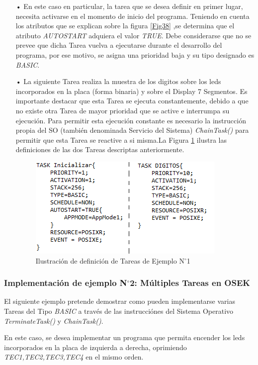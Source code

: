 \documentclass[12pt,letterpaper]{article}
\begin{document}
\begin{enumerate}
\item[•]En este caso en particular, la tarea que se desea definir en primer lugar, necesita activarse en el momento de inicio del programa. Teniendo en cuenta los atributos que se explican sobre la figura \ref{Fig38} ,se determina que el atributo \textit{AUTOSTART} adquiera el valor \textit{TRUE}. Debe considerarse que no se prevee que dicha Tarea vuelva a ejecutarse durante el desarrollo del programa, por ese motivo, se asigna una prioridad baja y su tipo designado es \textit{BASIC}.

\item[•]La siguiente Tarea realiza la muestra de los digitos sobre los leds incorporados en la placa (forma binaria) y sobre el Display 7 Segmentos. Es importante destacar que esta Tarea se ejecuta constantemente, debido a que no existe otra Tarea de mayor prioridad que se active e interrumpa su ejecución. Para permitir esta ejecución constante es necesario la instrucción propia del SO (también denominada Servicio del Sistema) \textit{ChainTask()} para permitir que esta Tarea se reactive a si misma.La Figura \ref{Fig39} ilustra las definiciones de las dos Tareas descriptas anteriormente.
\begin{figure}[H]
\centering
\includegraphics[width=8 cm]{figuras/f22.png}
\caption{Ilustración de definición de Tareas de Ejemplo N$^{\circ}$1}
\label{Fig39}
\end{figure}


\end{enumerate}

\subsubsection{Implementación de ejemplo N$^{\circ}$2: Múltiples Tareas en OSEK}

El siguiente ejemplo pretende demostrar como pueden implementarse varias Tareas del Tipo \textit{BASIC} a través de las instrucciónes del Sistema Operativo \textit{TerminateTask()} y \textit{ChainTask()}.

En este caso, se desea implementar un programa que  permita encender los leds incorporados en la placa de izquierda a derecha, oprimiendo \textit{TEC1,TEC2,TEC3,TEC4} en el mismo orden.
\end{document}
